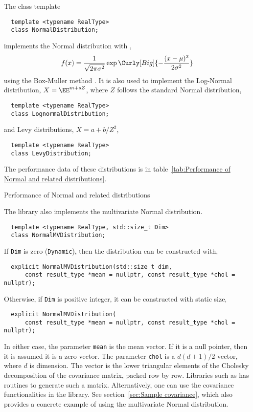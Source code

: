 The class template
\begin{Verbatim}
  template <typename RealType>
  class NormalDistribution;
\end{Verbatim}
implements the Normal distribution with \pdf,
\begin{equation*}
  f(x) =
  \frac{1}{\sqrt{2\pi\sigma^2}}\exp\Curly[Big]{-\frac{(x-\mu)^2}{2\sigma^2}}
\end{equation*}
using the Box-Muller method \parencite{Box:1958hv}. It is also used to
implement the Log-Normal distribution, $X = \EE^{m + s Z}$, where $Z$ follows
the standard Normal distribution,
\begin{Verbatim}
  template <typename RealType>
  class LognormalDistribution;
\end{Verbatim}
and Levy distributions, $X = a + b / Z^2$,
\begin{Verbatim}
  template <typename RealType>
  class LevyDistribution;
\end{Verbatim}
The performance data of these distributions is in table~\ref{tab:Performance of
  Normal and related distributions}.

\begin{table}
  \caption{Performance of Normal and related distributions}
  \label{tab:Performance of Normal and related distributions}
\end{table}

The library also implements the multivariate Normal distribution.
\begin{Verbatim}
  template <typename RealType, std::size_t Dim>
  class NormalMVDistribution;
\end{Verbatim}
If \verb|Dim| is zero (\verb|Dynamic|), then the distribution can be
constructed with,
\begin{Verbatim}
  explicit NormalMVDistribution(std::size_t dim,
      const result_type *mean = nullptr, const result_type *chol = nullptr);
\end{Verbatim}
Otherwise, if \verb|Dim| is positive integer, it can be constructed with static
size,
\begin{Verbatim}
  explicit NormalMVDistribution(
      const result_type *mean = nullptr, const result_type *chol = nullptr);
\end{Verbatim}
In either case, the parameter \verb|mean| is the mean vector. If it is a null
pointer, then it is assumed it is a zero vector. The parameter \verb|chol| is a
$d(d + 1)/2$-vector, where $d$ is dimension. The vector is the lower triangular
elements of the Cholesky decomposition of the covariance matrix, packed row by
row. Libraries such as \lapack has routines to generate such a matrix.
Alternatively, one can use the covariance functionalities in the library. See
section~\ref{sec:Sample covariance}, which also provides a concrete example of
using the multivariate Normal distribution.

